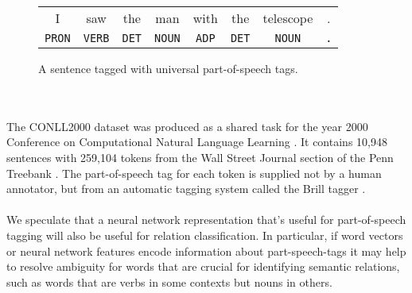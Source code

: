 \begin{figure}[h!]
	\begin{center}
		\begin{tabular}{c c c c c c c c}
	I & saw & the & man & with & the & telescope & . \\
	\texttt{PRON} & \texttt{VERB} & \texttt{DET} & \texttt{NOUN} & \texttt{ADP} & \texttt{DET} & \texttt{NOUN} & \texttt{.}
		\end{tabular}
	\end{center}
	\caption{A sentence tagged with universal part-of-speech tags.}
	\label{pos}
\end{figure}
\\\\
The CONLL2000 dataset was produced as a shared task for the year 2000 Conference on Computational Natural Language Learning \citep{kimsang2000}. It contains 10,948 sentences with 259,104 tokens from the Wall Street Journal section of the Penn Treebank \citep{marcus1999}. The part-of-speech tag for each token is supplied not by a human annotator, but from an automatic tagging system called the Brill tagger \citep{brill1992}.
\\\\
We speculate that a neural network representation that's useful for part-of-speech tagging will also be useful for relation classification. In particular, if word vectors or neural network features encode information about part-speech-tags it may help to resolve ambiguity for words that are crucial for identifying semantic relations, such as  words that are verbs in some contexts but nouns in others.

